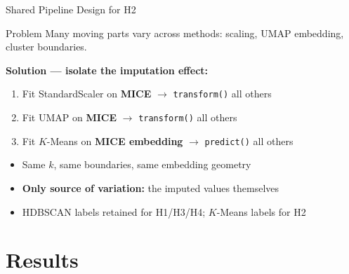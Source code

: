 \documentclass[aspectratio=169, 11pt]{beamer}
\begin{document}
\begin{frame}{Shared Pipeline Design for H2}
  \begin{block}{Problem}
    Many moving parts vary across methods: scaling, UMAP embedding, cluster boundaries.
  \end{block}

  \vspace{0.5em}
  \textbf{Solution --- isolate the imputation effect:}
  \begin{enumerate}
    \item Fit StandardScaler on \textbf{MICE} $\to$ \texttt{transform()} all others
    \item Fit UMAP on \textbf{MICE} $\to$ \texttt{transform()} all others
    \item Fit $K$-Means on \textbf{MICE embedding} $\to$ \texttt{predict()} all others
  \end{enumerate}

  \vspace{0.5em}
  \begin{itemize}
    \item Same $k$, same boundaries, same embedding geometry
    \item \textbf{Only source of variation:} the imputed values themselves
    \item HDBSCAN labels retained for H1/H3/H4; $K$-Means labels for H2
  \end{itemize}
\end{frame}

\section{Results}
\end{document}
